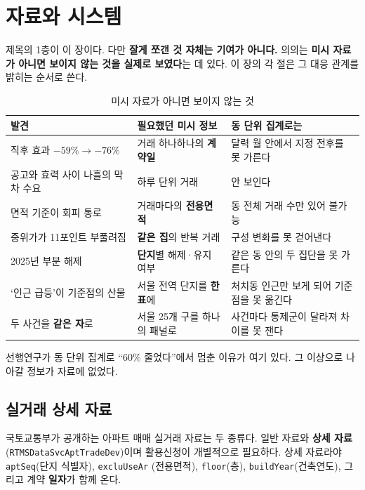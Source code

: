 
\section{자료와 시스템}

제목의 1층이 이 장이다. 다만 \textbf{잘게 쪼갠 것 자체는 기여가 아니다.} 의의는
\textbf{미시 자료가 아니면 보이지 않는 것을 실제로 보였다}는 데 있다. 이 장의
각 절은 그 대응 관계를 밝히는 순서로 쓴다.

\begin{table}[htbp]
  \centering
  \caption{미시 자료가 아니면 보이지 않는 것}
  \label{tab:micro-need}
  \begin{tabular}{p{5.2cm}p{4.0cm}p{5.0cm}}
    \toprule
    \textbf{발견} & \textbf{필요했던 미시 정보} & \textbf{동 단위 집계로는} \\
    \midrule
    직후 효과 $-59\% \to -76\%$ & 거래 하나하나의 \textbf{계약일} &
      달력 월 안에서 지정 전후를 못 가른다 \\
    공고와 효력 사이 나흘의 막차 수요 & 하루 단위 거래 & 안 보인다 \\
    면적 기준이 회피 통로 & 거래마다의 \textbf{전용면적} &
      동 전체 거래 수만 있어 불가능 \\
    중위가가 11포인트 부풀려짐 & \textbf{같은 집}의 반복 거래 &
      구성 변화를 못 걷어낸다 \\
    2025년 부분 해제 & \textbf{단지}별 해제·유지 여부 &
      같은 동 안의 두 집단을 못 가른다 \\
    `인근 급등'이 기준점의 산물 & 서울 전역 단지를 \textbf{한 표}에 &
      처치동 인근만 보게 되어 기준점을 못 옮긴다 \\
    두 사건을 \textbf{같은 자}로 & 서울 25개 구를 하나의 패널로 &
      사건마다 통제군이 달라져 차이를 못 잰다 \\
    \bottomrule
  \end{tabular}
\end{table}

선행연구가 동 단위 집계로 ``60\% 줄었다''에서 멈춘 이유가 여기 있다. 그 이상으로
나아갈 정보가 자료에 없었다.

\subsection{실거래 상세 자료}

국토교통부가 공개하는 아파트 매매 실거래 자료는 두 종류다. 일반 자료와
\textbf{상세 자료}(\texttt{RTMSDataSvcAptTradeDev})이며 활용신청이 개별적으로
필요하다. 상세 자료라야 \texttt{aptSeq}(단지 식별자), \texttt{excluUseAr}
(전용면적), \texttt{floor}(층), \texttt{buildYear}(건축연도), 그리고 계약
\textbf{일자}가 함께 온다.

